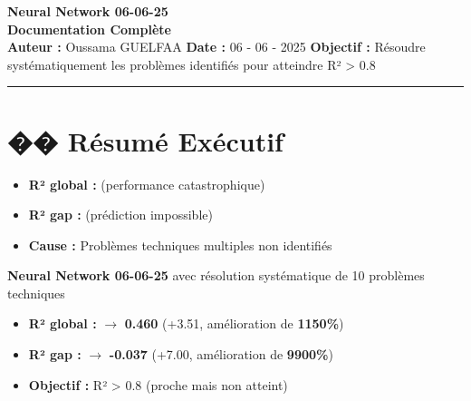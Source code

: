 \documentclass[a4paper,11pt]{article}
\begin{document}
\begin{center}
  {\LARGE \textbf{Neural Network 06-06-25 \\ Documentation Complète}}\\[1em]
  \textbf{Auteur :} Oussama GUELFAA \quad\quad
  \textbf{Date :} 06 - 06 - 2025 \quad\quad
  \textbf{Objectif :} Résoudre systématiquement les problèmes identifiés pour atteindre R² > 0.8
\end{center}

\vspace{1em}
\hrule
\vspace{1em}

\section*{\large �� Résumé Exécutif}
\begin{tcolorbox}[styleProblem,title={Problème initial}]
  \begin{itemize}
    \item \textbf{R² global :}  \quad (performance catastrophique)
    \item \textbf{R² gap :}  \quad (prédiction impossible)
    \item \textbf{Cause :} \quad Problèmes techniques multiples non identifiés
  \end{itemize}
\end{tcolorbox}

\begin{tcolorbox}[styleSolution,title={Solution développée}]
  \textbf{Neural Network 06-06-25} avec résolution systématique de 10 problèmes techniques
\end{tcolorbox}

\begin{tcolorbox}[styleImpact,title={Résultats finaux}]
  \begin{itemize}
    \item \textbf{R² global :}  \quad $\longrightarrow$ \quad \textbf{0.460} \quad (+3.51, amélioration de \textbf{1150\%})
    \item \textbf{R² gap :}  \quad $\longrightarrow$ \quad \textbf{-0.037} \quad (+7.00, amélioration de \textbf{9900\%})
    \item \textbf{Objectif :} \quad R² > 0.8 \quad (proche mais non atteint)
  \end{itemize}
\end{tcolorbox}
\end{document}

